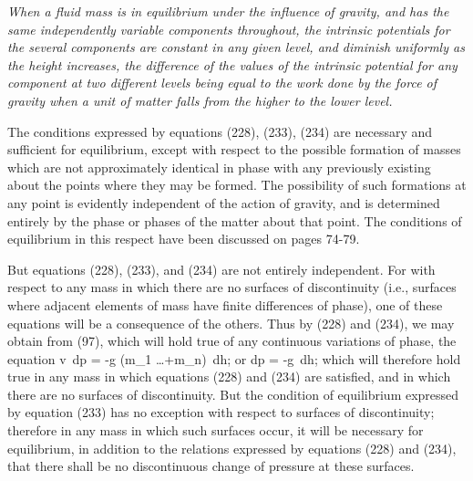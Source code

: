 \documentclass[12pt]{article}
\begin{document}
\textit{When a fluid mass is in equilibrium under the influence of gravity, and has the same independently variable components throughout, the intrinsic potentials for the several components are constant in any given level, and diminish uniformly as the height increases, the difference of the values of the intrinsic potential for any component at two different levels being equal to the work done by the force of gravity when a unit of matter falls from the higher to the lower level.}


The conditions expressed by equations (228), (233), (234) are necessary and sufficient for equilibrium, except with respect to the possible formation of masses which are not approximately identical in phase with any previously existing about the points where they may be formed. The possibility of such formations at any point is evidently independent of the action of gravity, and is determined entirely by the phase or phases of the matter about that point. The conditions of equilibrium in this respect have been discussed on pages 74-79.


But equations (228), (233), and (234) are not entirely independent. For with respect to any mass in which there are no surfaces of discontinuity (i.e., surfaces where adjacent elements of mass have finite differences of phase), one of these equations will be a consequence of the others. Thus by (228) and (234), we may obtain from (97), which will hold true of any continuous variations of phase, the equation
\eqs v \,dp = -g (m_1 \dots +m_n) \,dh;  \label{235}\eqe
or     
\eqs     dp = -g \gamma \,dh;  \label{236}\eqe
which will therefore hold true in any mass in which equations (228) and (234) are satisfied, and in which there are no surfaces of discontinuity. But the condition of equilibrium expressed by equation (233) has no exception with respect to surfaces of discontinuity; therefore in any mass in which such surfaces occur, it will be necessary for equilibrium, in addition to the relations expressed by equations (228) and (234), that there shall be no discontinuous change of pressure at these surfaces.
\end{document}
